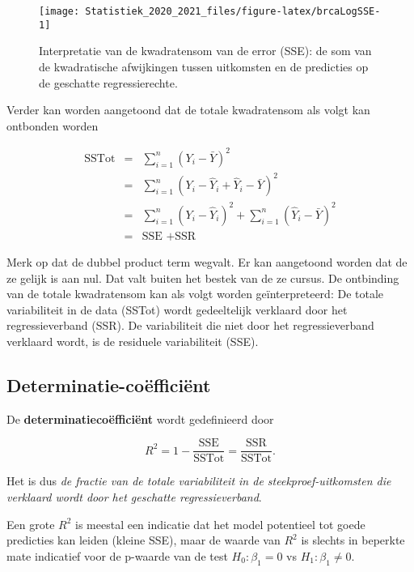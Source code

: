 \documentclass[
  12pt,dutch,coursenotes]{book}
\theoremstyle{definition}
\theoremstyle{definition}
\theoremstyle{definition}
\theoremstyle{remark}
\begin{document}
\begin{figure}

{\centering \texttt{[image: Statistiek\_2020\_2021\_files/figure-latex/brcaLogSSE-1]} 

}

\caption{Interpretatie van de kwadratensom van de error (SSE): de som van de kwadratische afwijkingen tussen uitkomsten en de predicties op de geschatte regressierechte.}\label{fig:brcaLogSSE}
\end{figure}

Verder kan worden aangetoond dat de totale kwadratensom als volgt kan ontbonden worden

\begin{eqnarray*}
  \text{SSTot}
    &=&  \sum_{i=1}^n (Y_i-\bar{Y})^2 \\
    &=&  \sum_{i=1}^n (Y_i-\hat{Y}_i+\hat{Y}_i-\bar{Y})^2 \\
    &=&  \sum_{i=1}^n (Y_i-\hat{Y}_i)^2+\sum_{i=1}^n(\hat{Y}_i-\bar{Y})^2 \\
    &=&  \text{SSE }+\text{SSR}  
\end{eqnarray*}

Merk op dat de dubbel product term wegvalt. Er kan aangetoond worden dat de ze gelijk is aan nul. Dat valt buiten het bestek van de ze cursus.
De ontbinding van de totale kwadratensom kan als volgt worden geïnterpreteerd:
De totale variabiliteit in de data (SSTot) wordt gedeeltelijk verklaard door het regressieverband (SSR). De variabiliteit die niet door het regressieverband verklaard wordt, is de residuele variabiliteit (SSE).

\hypertarget{determinatie-couxebfficiuxebnt}{%
\subsection{Determinatie-coëfficiënt}\label{determinatie-couxebfficiuxebnt}}

De \textbf{determinatiecoëfficiënt} wordt gedefinieerd door

\[ R^2 = 1-\frac{\text{SSE}}{\text{SSTot}}=\frac{\text{SSR}}{\text{SSTot}}.\]

Het is dus \emph{de fractie van de totale variabiliteit in de steekproef-uitkomsten die verklaard wordt door het geschatte regressieverband}.

Een grote \(R^2\) is meestal een indicatie dat het model potentieel tot goede predicties kan leiden (kleine SSE), maar de waarde van \(R^2\) is slechts in beperkte mate indicatief voor de p-waarde van de test \(H_0:\beta_1=0\) vs \(H_1:\beta_1\neq0\).
\end{document}
